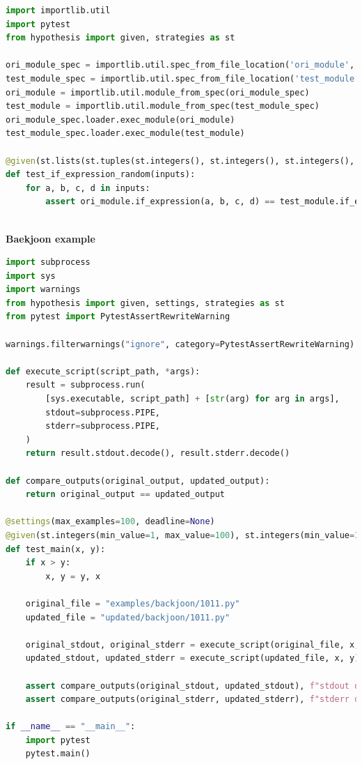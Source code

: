 \documentclass[11pt]{article}
\begin{document}
\begin{lstlisting}[language=python]
import importlib.util
import pytest
from hypothesis import given, strategies as st

ori_module_spec = importlib.util.spec_from_file_location('ori_module', './examples/simple/diff_example2.py')
test_module_spec = importlib.util.spec_from_file_location('test_module', './updated/simple/diff_example2.py')
ori_module = importlib.util.module_from_spec(ori_module_spec)
test_module = importlib.util.module_from_spec(test_module_spec)
ori_module_spec.loader.exec_module(ori_module)
test_module_spec.loader.exec_module(test_module)

@given(st.lists(st.tuples(st.integers(), st.integers(), st.integers(), st.integers()), min_size=100, max_size=100, unique=True))
def test_if_expression_random(inputs):
    for a, b, c, d in inputs:
        assert ori_module.if_expression(a, b, c, d) == test_module.if_expression(a, b, c, d)
\end{lstlisting}

\\

\textbf{Baekjoon example}

\begin{lstlisting}[language=python]
import subprocess
import sys
import warnings
from hypothesis import given, settings, strategies as st
from pytest import PytestAssertRewriteWarning

warnings.filterwarnings("ignore", category=PytestAssertRewriteWarning)

def execute_script(script_path, *args):
    result = subprocess.run(
        [sys.executable, script_path] + [str(arg) for arg in args],
        stdout=subprocess.PIPE,
        stderr=subprocess.PIPE,
    )
    return result.stdout.decode(), result.stderr.decode()

def compare_outputs(original_output, updated_output):
    return original_output == updated_output

@settings(max_examples=100, deadline=None)
@given(st.integers(min_value=1, max_value=100), st.integers(min_value=1, max_value=100))
def test_main(x, y):
    if x > y:
        x, y = y, x 

    original_file = "examples/backjoon/1011.py"
    updated_file = "updated/backjoon/1011.py" 
    
    original_stdout, original_stderr = execute_script(original_file, x, y)
    updated_stdout, updated_stderr = execute_script(updated_file, x, y)
    
    assert compare_outputs(original_stdout, updated_stdout), f"stdout differs for inputs: x={x}, y={y}"
    assert compare_outputs(original_stderr, updated_stderr), f"stderr differs for inputs: x={x}, y={y}"

if __name__ == "__main__":
    import pytest
    pytest.main()
\end{lstlisting}
\end{document}
